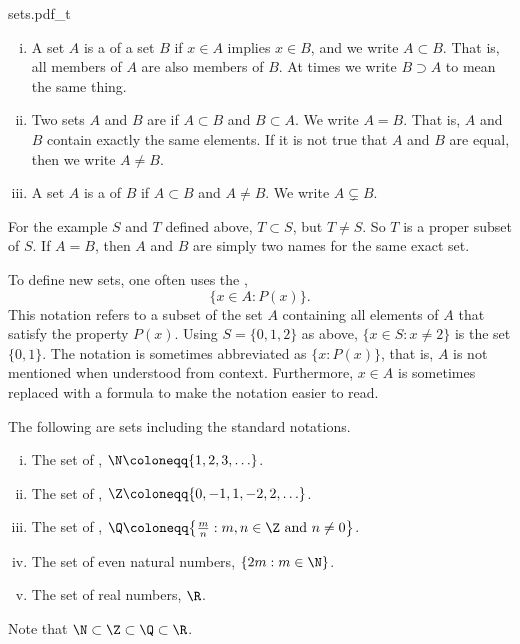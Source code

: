 \begin{myfigureht}
{sets.pdf_t}
\caption{A diagram of the example sets $S$ and its subset $T$.\label{fig:sets}}
\end{myfigureht}

\begin{defn}
\pagebreak[2]
\leavevmode
\begin{enumerate}[(i)]
\item
A set $A$ is a \emph{}
of a set $B$ if $x \in A$ implies $x \in B$, and we write $A \subset B$.
That is, all members of $A$ are also members of $B$.  At times we
write $B \supset A$ to mean the same thing.
\item
Two sets $A$ and $B$ are \emph{} if $A \subset B$ and $B
\subset A$.  We write $A = B$.
That is, $A$ and $B$ contain exactly the same elements.
If it is not true that $A$ and $B$ are equal, then 
we write $A \not= B$.
\item
A set $A$ is a \emph{} of $B$ if $A \subset B$
and $A \not= B$.  We write $A \subsetneq B$.
\end{enumerate}
\end{defn}

For the example $S$ and $T$ defined above, $T \subset S$, but
$T \not= S$.  So $T$ is a proper subset of $S$.
If $A = B$, then $A$ and $B$ are simply two names for the
same exact set.

To define new sets, one often uses
the
\emph{},
\begin{equation*}
\bigl\{ x \in A : P(x) \bigr\} .
\end{equation*}
This notation refers to a subset of the set $A$ containing all elements
of $A$ that satisfy the property $P(x)$.
Using $S = \{ 0, 1, 2 \}$ as above, $\{ x \in S : x \not= 2 \}$
is the set $\{ 0, 1 \}$.
The notation is sometimes
abbreviated as $\bigl\{ x : P(x) \bigr\}$, that is, $A$ is not mentioned when understood from context.
Furthermore, $x \in A$ is sometimes replaced with a formula to make the notation
easier to read.  

\begin{example}
The following are sets including the standard notations.
\begin{enumerate}[(i)]
\item The set of \emph{},
$\N \coloneqq \{ 1, 2, 3, \ldots
\}$.
\item The set of \emph{},
$\Z \coloneqq \{ 0, -1, 1, -2, 2, \ldots
\}$.
\item The set of \emph{},
$\Q \coloneqq \bigl\{ \frac{m}{n} :  m, n \in \Z \text{ and } n \not= 0 \bigr\}$.
\item The set of even natural numbers, $\{  2m : m \in \N \}$.
\item The set of real numbers,
$\R$.
\end{enumerate}

Note that $\N \subset \Z \subset \Q \subset \R$.
\end{example}


